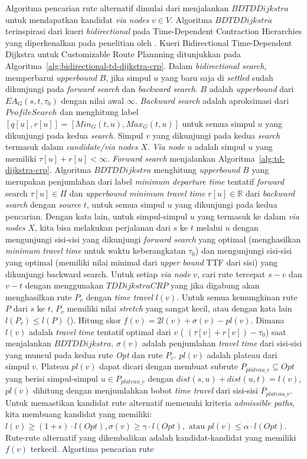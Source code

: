 Algoritma pencarian rute alternatif dimulai dari menjalankan $BDTDDijkstra$ untuk mendapatkan kandidat \textit{via nodes} $v\in V$. Algoritma $BDTDDijkstra$ terinspirasi dari kueri \textit{bidirectional} pada Time-Dependent Contraction Hierarchies yang diperkenalkan pada penelitian oleh \cite{Veit2013}. Kueri Bidirectional Time-Dependent Dijkstra untuk Customizable Route Plannning ditunjukkan pada Algoritma~\ref{alg:bidirectional-td-dijkstra-crp}. Dalam \textit{bidirectional search}, memperbarui \cite{Veit2013} \textit{upperbound} $B$, jika simpul $u$ yang baru saja di \textit{settled} sudah dikunjungi pada \textit{forward search} dan \textit{backward search}. $B$ adalah \textit{upperbound} dari $EA_G(s,t,\tau_0)$ dengan nilai awal $\infty$. \textit{Backward search} adalah aproksimasi dari $ProfileSearch$ dan menghitung label $[q[u], r[u]]=[Min_G(t,u), Max_G(t,u)]$ untuk semua simpul $u$ yang dikunjungi pada kedua \textit{search}. Simpul $v$ yang dikunjungi pada kedua \textit{search} termasuk dalam \textit{candidate/via nodes} $X$. \textit{Via node} $u$ adalah simpul $u$ yang memiliki $\tau[u] + r[u] < \infty$. \textit{Forward search} menjalankan Algoritma~\ref{alg:td-dijkstra-crp}. Algoritma $BDTDDijkstra$ menghitung \textit{upperbound} $B$ yang merupakan penjumlahan dari label \textit{minimum departure time} tentatif \textit{forward} search $\tau[u]\in \Pi$ dan \textit{upperbound minimum travel time} $r[u]\in \mathbb{R}$ dari \textit{backward search} dengan \textit{source} $t$, untuk semua simpul $u$ yang dikunjungi pada kedua pencarian. Dengan kata lain, untuk simpul-simpul $u$ yang termasuk ke dalam \textit{via nodes} $X$, kita bisa melakukan perjalanan dari $s$ ke $t$ melalui $u$ dengan mengunjungi sisi-sisi yang dikunjungi \textit{forward search} yang optimal (menghasilkan \textit{minimum travel time } untuk waktu keberangkatan $\tau_0$) dan mengunjungi sisi-sisi yang optimal (memiliki nilai minimal dari \textit{upper bound} TTF dari sisi) yang dikunjungi backward search. Untuk setiap \textit{via node} $v$, cari rute tercepat $s-v$ dan $v-t$ dengan menggunakan $TDDijkstraCRP$ yang jika digabung akan menghasilkan rute $P_v$ dengan \textit{time travel} $l(v)$. Untuk semua kemungkinan rute $P$ dari $s$ ke $t$, $P_v$ memiliki nilai \textit{stretch} yang sangat kecil, atau dengan kata lain $l(P_v)\leq l(P)$ (\cite{Abraham2010}). Hitung skor $f(v)=2l(v)+\sigma(v)-pl(v)$. Dimana $l(v)$ adalah \textit{travel time } tentatif optimal dari $v$ ( $(\tau[v]+r[v])-\tau_0$) saat menjalankan $BDTDDijkstra$. $\sigma(v)$ adalah penjumlahan \textit{travel time} dari sisi-sisi yang muncul pada kedua rute \textit{Opt} dan rute $P_v$. $pl(v)$ adalah plateau dari simpul $v$. Plateau $pl(v)$ dapat dicari dengan membuat subrute $P_{plateau\_v}\subseteq Opt$ yang berisi simpul-simpul $u\in P_{plateau\_v}$ dengan $dist(s,u)+dist(u,t)=l(v)$, $pl(v)$ dihitung dengan menjumlahkan bobot \textit{time travel} dari sisi-sisi $P_{plateau\_v}$. Untuk memastikan kandidat rute alternatif memenuhi kriteria \textit{admissible paths}, kita membuang kandidat yang memiliki: $l(v)\geq (1+\epsilon)\cdot l(Opt), \sigma(v)\geq\gamma \cdot l(Opt), \text{ atau } pl(v)\leq \alpha \cdot l(Opt)$. Rute-rute alternatif yang dikembalikan adalah kandidat-kandidat yang memiliki $f(v)$ terkecil. Algortima pencarian rute 